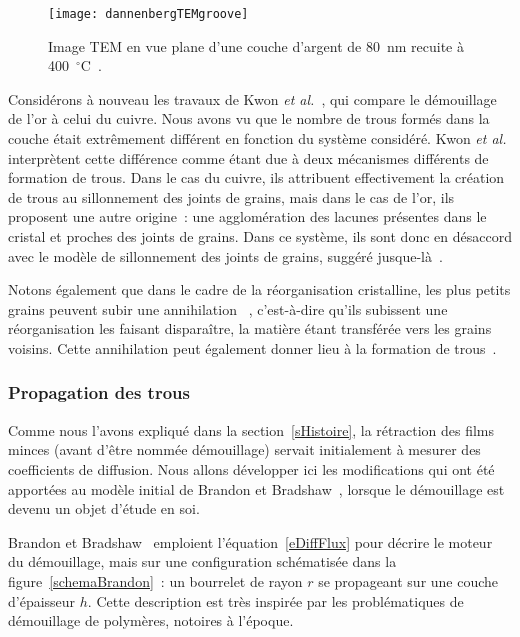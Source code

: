 \begin{figure}[!htb]
\centering
\texttt{[image: dannenbergTEMgroove]}
\caption{Image TEM en vue plane d'une couche d'argent de 80~nm recuite à 400~$^\circ$C~\cite{dannenberg2000situ}.}
\label{dannenbergTEMgroove}
\end{figure}
Considérons à nouveau les travaux de Kwon \textit{et al.}~\cite{kwon2003comparison}, qui compare le démouillage de l'or à celui du cuivre. Nous avons vu que le nombre de trous formés dans la couche était extrêmement différent en fonction du système considéré. Kwon \textit{et al.} interprètent cette différence comme étant due à deux mécanismes différents de formation de trous. Dans le cas du cuivre, ils attribuent effectivement la création de trous au sillonnement des joints de grains, mais dans le cas de l'or, ils proposent une autre origine~: une agglomération des lacunes présentes dans le cristal et proches des joints de grains. Dans ce système, ils sont donc en désaccord avec le modèle de sillonnement des joints de grains, suggéré jusque-là~\cite{frost1990simulation}.\par 
Notons également que dans le cadre de la réorganisation cristalline, les plus petits grains peuvent subir une \og annihilation \fg{}~\cite{frost1990simulation}, c'est-à-dire qu'ils subissent une réorganisation les faisant disparaître, la matière étant transférée vers les grains voisins. Cette annihilation peut également donner lieu à la formation de trous~\cite{derkach2014grain}.\par 



		\subsubsection{Propagation des trous}
Comme nous l'avons expliqué dans la section~\ref{sHistoire}, la rétraction des films minces (avant d'être nommée démouillage) servait initialement à mesurer des coefficients de diffusion. Nous allons développer ici les modifications qui ont été apportées au modèle initial de Brandon et Bradshaw~\cite{brandon1966mobility}, lorsque le démouillage est devenu un objet d'étude en soi.\par 
Brandon et Bradshaw~\cite{brandon1966mobility} emploient l'équation~\ref{eDiffFlux} pour décrire le moteur du démouillage, mais sur une configuration schématisée dans la figure~\ref{schemaBrandon}~: un bourrelet de rayon $r$ se propageant sur une couche d'épaisseur $h$. Cette description est très inspirée par les problématiques de démouillage de polymères, notoires à l'époque.\par 

